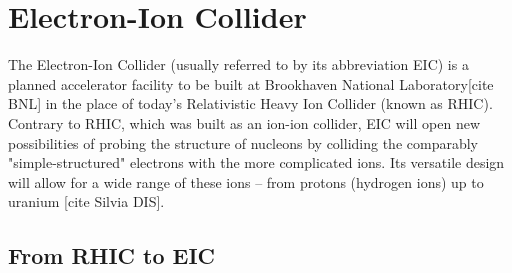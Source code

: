 \chapter{Electron-Ion Collider}\label{cha:EIC} %

The Electron-Ion Collider (usually referred to by its abbreviation EIC) is a planned accelerator facility to be built at Brookhaven National Laboratory[cite BNL] in the place of today's Relativistic Heavy Ion Collider (known as RHIC). Contrary to RHIC, which was built as an ion-ion collider, EIC will open new possibilities of probing the structure of nucleons by colliding the comparably "simple-structured" electrons with the more complicated ions. Its versatile design will allow for a wide range of these ions – from protons (hydrogen ions) up to uranium [cite Silvia DIS].

\section{From RHIC to EIC}














